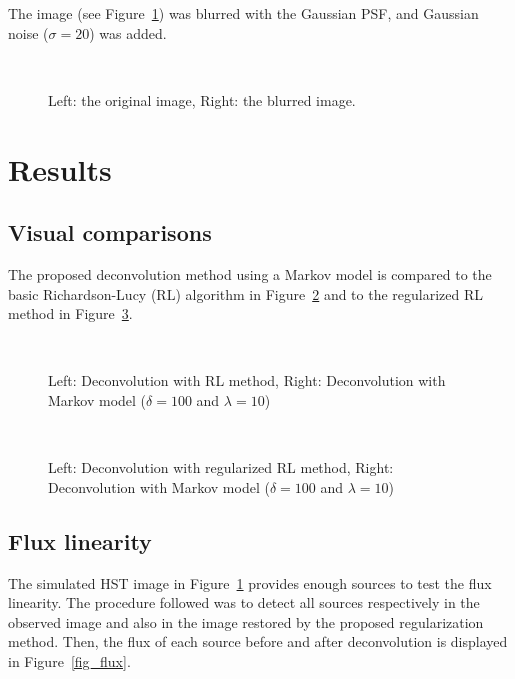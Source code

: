 The image (see Figure~\ref{fig_convol1}) was blurred with the Gaussian PSF, and Gaussian noise ($\sigma=20$) was
added.
\begin{figure}[htb]
\centerline{
\hbox{
}}
\caption{Left: the original image, Right: the blurred image.}
\label{fig_convol1}
\end{figure}
 
\section{Results}

\subsection{Visual comparisons} 

The proposed deconvolution method using a Markov model is compared to the 
basic Richardson-Lucy (RL) 
algorithm in 
Figure~\ref{fig_lucy} and to the regularized RL method in Figure~\ref{fig_mr}.
\begin{figure}[htb]
\centerline{
\hbox{
}}
\caption{Left: Deconvolution with RL method, Right: Deconvolution with
Markov model ($\delta=100$ and $\lambda=10$)}
\label{fig_lucy}
\end{figure}
\begin{figure}[htb]
\centerline{
\hbox{
}}
\caption{Left: Deconvolution with regularized RL method, Right: Deconvolution with
Markov model ($\delta=100$ and $\lambda=10$)}
\label{fig_mr}
\end{figure}

\subsection{Flux linearity}

The simulated HST image in Figure~\ref{fig_convol1} provides enough sources 
to test
the flux linearity. The procedure followed was to detect all sources 
respectively 
in the observed image and also in the image restored by the proposed 
regularization method.
Then, the flux of each source before and after deconvolution is 
displayed in Figure~\ref{fig_flux}.

